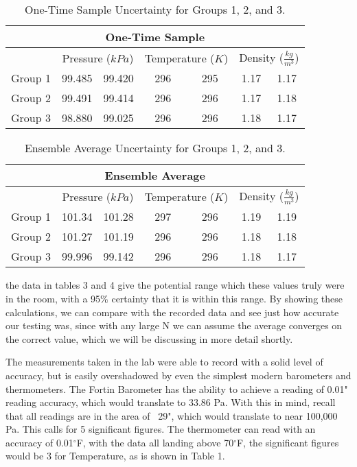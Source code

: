 \documentclass[conf]{new-aiaa}
\begin{document}
\begin{table}[ht]
    \centering
    \begin{tabular}{||c c c c c c c||}
        \hline
        \multicolumn{7}{||c||}{One-Time Sample} \\ \hline
        & \multicolumn{2}{c}{Pressure ($kPa$)} & \multicolumn{2}{c}{Temperature ($K$)} & \multicolumn{2}{c}{Density ($\frac{kg}{m^3}$)} & \\ \hline
        Group 1 & 99.485 & 99.420 & 296 & 295 & 1.17 & 1.17 \\ \hline
        Group 2 & 99.491 & 99.414 & 296 & 296 & 1.17 & 1.18 \\ \hline
        Group 3 & 98.880 & 99.025 & 296 & 296 & 1.18 & 1.17 \\ \hline
    \end{tabular}
    \caption{One-Time Sample Uncertainty for Groups 1, 2, and 3.}
\end{table}

\begin{table}[ht]
    \centering
    \begin{tabular}{||c c c c c c c||}
        \hline
        \multicolumn{7}{||c||}{Ensemble Average} \\ \hline
        & \multicolumn{2}{c}{Pressure ($kPa$)} & \multicolumn{2}{c}{Temperature ($K$)} & \multicolumn{2}{c}{Density ($\frac{kg}{m^3}$)} & \\ \hline
        Group 1 & 101.34 & 101.28 & 297 & 296 & 1.19 & 1.19 \\ \hline
        Group 2 & 101.27 & 101.19 & 296 & 296 & 1.18 & 1.18 \\ \hline
        Group 3 & 99.996 & 99.142 & 296 & 296 & 1.18 & 1.17 \\ \hline            
    \end{tabular}
    \caption{Ensemble Average Uncertainty for Groups 1, 2, and 3.}
\end{table}
the data in tables 3 and 4 give the potential range which these values truly were in the room, with a 95\% certainty that it is within this range. By showing these calculations, we can compare with the recorded data and see just how accurate our testing was, since with any large N we can assume the average converges on the correct value, which we will be discussing in more detail shortly.
\par
The measurements taken in the lab were able to record with a solid level of accuracy, but is easily overshadowed by even the simplest modern barometers and thermometers. The Fortin Barometer has the ability to achieve a reading of 0.01" reading accuracy, which would translate to 33.86 Pa. With this in mind, recall that all readings are in the area of ~29", which would translate to near 100,000 Pa. This calls for 5 significant figures. The thermometer can read with an accuracy of 0.01$^\circ$F, with the data all landing above 70$^\circ$F, the significant figures would be 3 for Temperature, as is shown in Table 1.
\par
\end{document}
